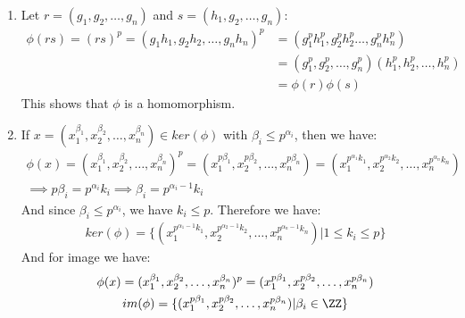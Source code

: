 \begin{enumerate}[label=\ilabel]
    \item 
        Let $r = (g_1, g_2, \dots, g_n)$ and $s = (h_1, g_2, \dots, g_n)$:
        \begin{equation*}
            \begin{split}
                \phi(rs) = (rs)^p = (g_1h_1, g_2h_2, \dots, g_nh_n)^p &= (g_1^p h_1^p, g_2^p h_2^p \dots, g_n^p h_n^p) \\
                &= (g_1^p, g_2^p, \dots, g_n^p) (h_1^p, h_2^p, \dots, h_n^p) \\
                &= \phi(r) \phi(s)
            \end{split}
        \end{equation*}
        This shows that $\phi$ is a homomorphism.

    \item
        If $x = (x_1^{\beta_1}, x_2^{\beta_2}, \dots, x_n^{\beta_n}) \in ker(\phi)$ with $\beta_i \le p^{\alpha_i}$, then we have:
        \begin{gather*}
            \phi(x) = (x_1^{\beta_1}, x_2^{\beta_2}, \dots, x_n^{\beta_n})^p = (x_1^{p \beta_1}, x_2^{p \beta_2}, \dots, x_n^{p \beta_n}) = (x_1^{p^{\alpha_1} k_1}, x_2^{p^{\alpha_2} k_2}, \dots, x_n^{p^{\alpha_n} k_n}) \\
            \implies p \beta_i = p^{\alpha_i} k_i \implies \beta_i = p^{\alpha_i - 1} k_i
        \end{gather*}
        And since $\beta_i \le p^{\alpha_i}$, we have $k_i \le p$. Therefore we have:
        \begin{gather*}
            ker(\phi) = \{(x_1^{p^{\alpha_1 - 1} k_1}, x_2^{p^{\alpha_2 - 1} k_2}, \dots, x_n^{p^{\alpha_n - 1} k_n}) | 1 \le k_i \le p  \}
        \end{gather*}
        And for image we have:
        \begin{gather*}
            \phi(x) = (x_1^{\beta_1}, x_2^{\beta_2}, \dots, x_n^{\beta_n})^p = (x_1^{p \beta_1}, x_2^{p \beta_2}, \dots, x_n^{p \beta_n}) \\
            im(\phi) = \{(x_1^{p \beta_1}, x_2^{p \beta_2}, \dots, x_n^{p \beta_n}) | \beta_i \in \ZZ\}
        \end{gather*}


\end{enumerate}
